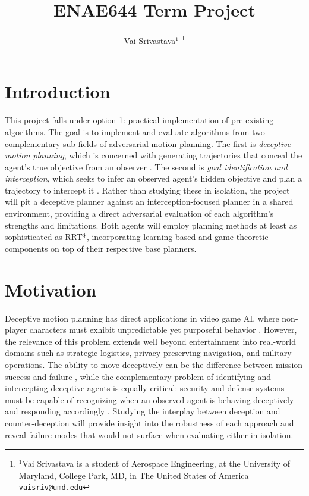 \documentclass[letterpaper, 10pt, conference]{ieeeconf}
\title{{\LARGE \textbf{ENAE644 Term Project}}}
\author{Vai Srivastava\( ^{1} \)
   \thanks{
      \( ^{1} \)Vai Srivastava is a student of Aerospace Engineering,
      at the University of Maryland, College Park, MD, in The United States of America
      {\tt\small vaisriv@umd.edu}
   }
}
\begin{document}
\maketitle
\thispagestyle{empty}
\pagestyle{empty}

\section{Introduction} \label{sec:introduction}

This project falls under option 1: practical implementation of pre-existing algorithms. The goal is to implement and evaluate algorithms from two complementary sub-fields of adversarial motion planning. The first is \emph{deceptive motion planning}, which is concerned with generating trajectories that conceal the agent's true objective from an observer \cite{nichols2022adversarial, xu2020single}. The second is \emph{goal identification and interception}, which seeks to infer an observed agent's hidden objective and plan a trajectory to intercept it \cite{zeng2023recognition, tastan2012learning}. Rather than studying these in isolation, the project will pit a deceptive planner against an interception-focused planner in a shared environment, providing a direct adversarial evaluation of each algorithm's strengths and limitations. Both agents will employ planning methods at least as sophisticated as RRT*, incorporating learning-based and game-theoretic components on top of their respective base planners.

\section{Motivation} \label{sec:motivation}

Deceptive motion planning has direct applications in video game AI, where non-player characters must exhibit unpredictable yet purposeful behavior \cite{tastan2012learning, zeng2023recognition}. However, the relevance of this problem extends well beyond entertainment into real-world domains such as strategic logistics, privacy-preserving navigation, and military operations. The ability to move deceptively can be the difference between mission success and failure \cite{xu2020single, nichols2022adversarial}, while the complementary problem of identifying and intercepting deceptive agents is equally critical: security and defense systems must be capable of recognizing when an observed agent is behaving deceptively and responding accordingly \cite{zeng2023recognition, xu2019goal}. Studying the interplay between deception and counter-deception will provide insight into the robustness of each approach and reveal failure modes that would not surface when evaluating either in isolation.
\end{document}
